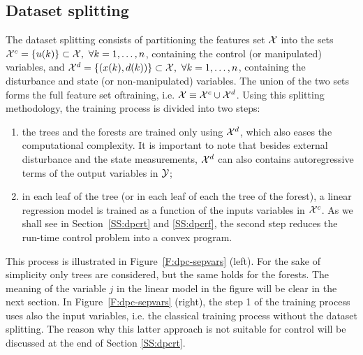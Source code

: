 \subsection{Dataset splitting}
\label{SS:sepvar}

\textcolor[rgb]{0,0,1}{The dataset splitting consists of partitioning the features set $\mathcal{X}$ into the sets $\mathcal{X}^c = \{u(k)\}\subset\mathcal{X},\ \forall k=1,\ldots,n$, containing the control (or manipulated) variables, and $\mathcal{X}^d = \{(x(k),d(k))\}\subset\mathcal{X},\ \forall k=1,\ldots,n$, containing the disturbance and state (or non-manipulated) variables.
The union of the two sets forms the full feature set oftraining, i.e. $\mathcal{X} \equiv \mathcal{X}^c \cup \mathcal{X}^d$.
Using this splitting methodology, the training process is divided into two steps:
	\begin{enumerate}
		\item the trees and the forests are trained only using $\mathcal{X}^d$, which also eases the computational complexity.
			  It is important to note that besides external disturbance and the state measurements, $\mathcal{X}^d$ can also contains autoregressive terms of the output variables in $\mathcal{Y}$;
		\item in each leaf of the tree (or in each leaf of each the tree of the forest), a linear regression model is trained as a function of the inputs variables in $\mathcal{X}^c$.
		As we shall see in Section~\ref{SS:dpcrt} and \ref{SS:dpcrf}, the second step reduces the run-time control problem into a convex program.
	\end{enumerate}
This process is illustrated in Figure~\ref{F:dpc-sepvars} (left). For the sake of simplicity only trees are considered, but the same holds for the forests. The meaning of the variable $j$ in the linear model in the figure will be clear in the next section.
In Figure~\ref{F:dpc-sepvars} (right), the step 1 of the training process uses also the input variables, i.e. the classical training process without the dataset splitting.
The reason why this latter approach is not suitable for control will be discussed at the end of Section \ref{SS:dpcrt}.
}

